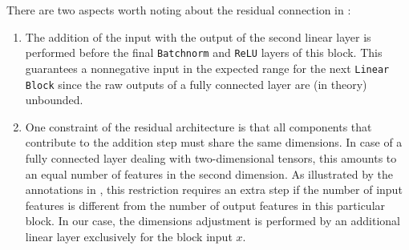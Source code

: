 There are two aspects worth noting about the residual connection in :
\begin{enumerate}
      \item The addition of the input with the output of the second linear layer is performed before the final \texttt{Batchnorm} and \texttt{ReLU} layers of this block.
            This guarantees a nonnegative input in the expected range for the next \texttt{Linear Block} since the raw outputs of a fully connected layer are (in theory) unbounded.

      \item One constraint of the residual architecture is that all components that contribute to the addition step must share the same dimensions.
            In case of a fully connected layer dealing with two-dimensional tensors, this amounts to an equal number of features in the second dimension.
            As illustrated by the annotations in , this restriction requires an extra step if the number of input features is different from the number of output features in this particular block.
            In our case, the dimensions adjustment is performed by an additional linear layer exclusively for the block input $x$.
\end{enumerate}

